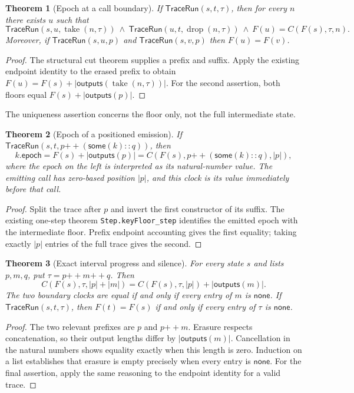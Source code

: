 \documentclass[11pt]{article}
\newtheorem{theorem}{Theorem}
\newcommand{\Trace}{\ensuremath{\mathsf{TraceRun}}}
\newcommand{\erase}{\ensuremath{\mathsf{outputs}}}
\newcommand{\None}{\ensuremath{\mathsf{none}}}
\newcommand{\Some}{\ensuremath{\mathsf{some}}}
\newcommand{\cat}{\mathbin{+\!+}}
\begin{document}
\begin{theorem}[Epoch at a call boundary]
If $\Trace(s,t,\tau)$, then for every $n$ there exists $u$ such that
\[
\Trace(s,u,\operatorname{take}(n,\tau))\ \land\
\Trace(u,t,\operatorname{drop}(n,\tau))\ \land\ F(u)=C(F(s),\tau,n).
\]
Moreover, if $\Trace(s,u,p)$ and $\Trace(s,v,p)$ then $F(u)=F(v)$.
\end{theorem}
\begin{proof}
The structural cut theorem supplies a prefix and suffix. Apply the existing endpoint
identity to the erased prefix to obtain
$F(u)=F(s)+|\erase(\operatorname{take}(n,\tau))|$.
For the second assertion, both floors equal $F(s)+|\erase(p)|$.
\end{proof}
The uniqueness assertion concerns the floor only, not the full intermediate state.

\begin{theorem}[Epoch of a positioned emission]
If $\Trace(s,t,p\cat(\Some(k)::q))$, then
\[
 k.\mathsf{epoch}=F(s)+|\erase(p)|
 = C(F(s),p\cat(\Some(k)::q),|p|),
\]
where the epoch on the left is interpreted as its natural-number value. The emitting
call has zero-based position $|p|$, and this clock is its value immediately before
that call.
\end{theorem}
\begin{proof}
Split the trace after $p$ and invert the first constructor of its suffix. The existing
one-step theorem \texttt{Step.keyFloor\_step} identifies the emitted epoch with the
intermediate floor. Prefix endpoint accounting gives the first equality; taking exactly
$|p|$ entries of the full trace gives the second.
\end{proof}

\begin{theorem}[Exact interval progress and silence]
For every state $s$ and lists $p,m,q$, put $\tau=p\cat m\cat q$. Then
\[
 C(F(s),\tau,|p|+|m|)=C(F(s),\tau,|p|)+|\erase(m)|.
\]
The two boundary clocks are equal if and only if every entry of $m$ is $\None$.
If $\Trace(s,t,\tau)$, then $F(t)=F(s)$ if and only if every entry of $\tau$ is $\None$.
\end{theorem}
\begin{proof}
The two relevant prefixes are $p$ and $p\cat m$. Erasure respects concatenation,
so their output lengths differ by $|\erase(m)|$. Cancellation in the natural numbers
shows equality exactly when this length is zero. Induction on a list establishes
that erasure is empty precisely when every entry is $\None$. For the final assertion,
apply the same reasoning to the endpoint identity for a valid trace.
\end{proof}
\end{document}
